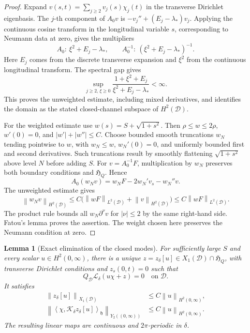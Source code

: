 \documentclass[11pt,a4paper]{article}
\newtheorem{lemma}{Lemma}
\newcommand{\D}{\mathcal D}
\newcommand{\Lop}{\mathcal L}
\newcommand{\Kop}{\mathcal K}
\newcommand{\norm}[1]{\left\lVert#1\right\rVert}
\newcommand{\ip}[2]{\left\langle#1,#2\right\rangle}
\begin{document}
\begin{proof}
Expand $v(s,t)=\sum_{j\ge2}v_j(s)\chi_j(t)$ in the transverse
Dirichlet eigenbasis. The $j$-th component of $A_0v$ is
$-v_j''+(E_j-\lambda_*)v_j$. Applying the continuous cosine transform
in the longitudinal variable $s$, corresponding to Neumann data at zero,
gives the multipliers
\[
 A_0:\ \xi^2+E_j-\lambda_*,
 \qquad A_0^{-1}:\ (\xi^2+E_j-\lambda_*)^{-1}.
\]
Here $E_j$ comes from the discrete transverse expansion and $\xi^2$
from the continuous longitudinal transform. The spectral gap gives
\[
 \sup_{j\ge2,\,\xi\ge0}
 \frac{1+\xi^2+E_j}{\xi^2+E_j-\lambda_*}<\infty.
\]
This proves the unweighted estimate, including mixed derivatives, and
identifies the domain as the stated closed-channel subspace of $H^2(\D)$.

For the weighted estimate use $w(s)=S+\sqrt{1+s^2}$.
Then $\rho\le w\le2\rho$, $w'(0)=0$, and $|w'|+|w''|\le C$.
Choose bounded smooth truncations $w_N$ tending pointwise to $w$, with
$w_N\le w$, $w_N'(0)=0$, and uniformly bounded first and second
derivatives. Such truncations result by smoothly flattening
$\sqrt{1+s^2}$ above level $N$ before adding $S$.
For $v=A_0^{-1}F$, multiplication by $w_N$ preserves both boundary
conditions and $\mathfrak H_Q$. Hence
\[
 A_0(w_Nv)=w_NF-2w_N'v_s-w_N''v.
\]
The unweighted estimate gives
\[
 \norm{w_Nv}_{H^2(\D)}
 \le C\bigl(\norm{wF}_{L^2(\D)}+\norm{v}_{H^2(\D)}\bigr)
 \le C\norm{wF}_{L^2(\D)}.
\]
The product rule bounds all $w_N\partial^\nu v$ for $|\nu|\le2$
by the same right-hand side. Fatou's lemma proves the assertion.
The weight chosen here preserves the Neumann condition at zero.
\end{proof}

\begin{lemma}[Exact elimination of the closed modes]\label{lem:eliminate}
For sufficiently large $S$ and every scalar $u\in H^2(0,\infty)$, there
is a unique $z=z_\delta[u]\in X_1(\D)\cap\mathfrak H_Q$, with transverse Dirichlet
conditions and $z_s(0,t)=0$ such that
\[
 Q_{\D}\Lop_\delta(u\chi+z)=0\quad\text{on }\D.
\]
It satisfies
\begin{equation}\label{eq:z-est}
 \begin{aligned}
 \norm{z_\delta[u]}_{X_1(\D)}&\le C\norm{u}_{H^2(0,\infty)},\\
 \norm{\ip{\chi}{\Kop_\delta z_\delta[u]}_{\mathfrak h}}_{Y_2((0,\infty))}
 &\le C\norm{u}_{H^2(0,\infty)}.
 \end{aligned}
\end{equation}
The resulting linear maps are continuous and $2\pi$-periodic in $\delta$.
\end{lemma}
\end{document}

